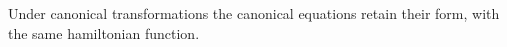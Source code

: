 Under canonical transformations the canonical equations retain their form, with the same hamiltonian function.
